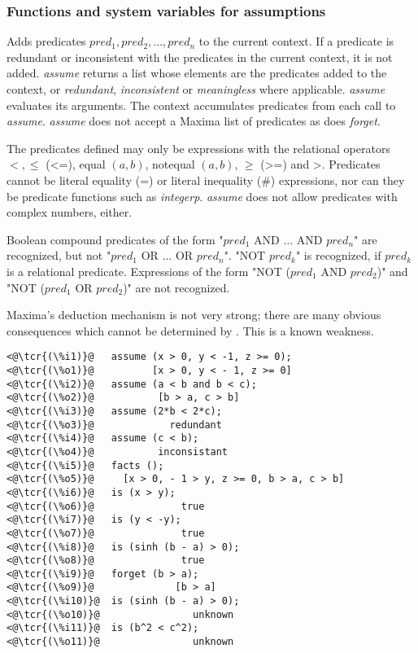 \documentclass[../Maxima_Workbook.tex]{subfiles}
\begin{document}
\subsubsection{Functions and system variables for assumptions}

\lz \hypertarget{assume}{} \hfill \tcr{[function]}

\lz Adds predicates $ pred_1, pred_2, \dots, pred_n $ to the current context. If a predicate is redundant or inconsistent with the predicates in the current context, it is not added. \emph{assume} returns a list whose elements are the predicates added to the context, or \emph{redundant}, \emph{inconsistent} or \emph{meaningless} where applicable. \emph{assume} evaluates its arguments. The context accumulates predicates from each call to \emph{assume}. \emph{assume} does not accept a Maxima list of predicates as does \emph{forget}. 

\lz The predicates defined may only be expressions with the relational operators $ <, \leq $ (<=), equal $ (a,b) $, notequal $ (a,b) $, $ \geq $ (>=) and >. Predicates cannot be literal equality (=) or literal inequality (\#) expressions, nor can they be predicate functions such as \emph{integerp}. \emph{assume} does not allow predicates with complex numbers, either.

\lz Boolean compound predicates of the form "$ pred_1 $ AND $\dots$ AND $pred_n $" are recognized, but not "$ pred_1$ OR $\dots$ OR $pred_n$". "NOT $pred_k$" is recognized, if $pred_k$ is a relational predicate. Expressions of the form "NOT ($pred_1$ AND $pred_2$)" and "NOT ($pred_1$ OR $pred_2$)" are not recognized.

\lz Maxima’s deduction mechanism is not very strong; there are many obvious consequences
which cannot be determined by . This is a known weakness.

\lzz \begin{lstlisting}
<@\tcr{(\%i1)}@   assume (x > 0, y < -1, z >= 0);
<@\tcr{(\%o1)}@		     [x > 0, y < - 1, z >= 0]
<@\tcr{(\%i2)}@   assume (a < b and b < c);
<@\tcr{(\%o2)}@			  [b > a, c > b]
<@\tcr{(\%i3)}@   assume (2*b < 2*c);
<@\tcr{(\%o3)}@			    redundant
<@\tcr{(\%i4)}@   assume (c < b);
<@\tcr{(\%o4)}@			  inconsistant
<@\tcr{(\%i5)}@   facts ();
<@\tcr{(\%o5)}@		[x > 0, - 1 > y, z >= 0, b > a, c > b]
<@\tcr{(\%i6)}@   is (x > y);
<@\tcr{(\%o6)}@			      true
<@\tcr{(\%i7)}@   is (y < -y);
<@\tcr{(\%o7)}@			      true
<@\tcr{(\%i8)}@   is (sinh (b - a) > 0);
<@\tcr{(\%o8)}@			      true
<@\tcr{(\%i9)}@   forget (b > a);
<@\tcr{(\%o9)}@			     [b > a]
<@\tcr{(\%i10)}@  is (sinh (b - a) > 0);
<@\tcr{(\%o10)}@			    unknown
<@\tcr{(\%i11)}@  is (b^2 < c^2);
<@\tcr{(\%o11)}@			    unknown

\end{lstlisting}
\end{document}
